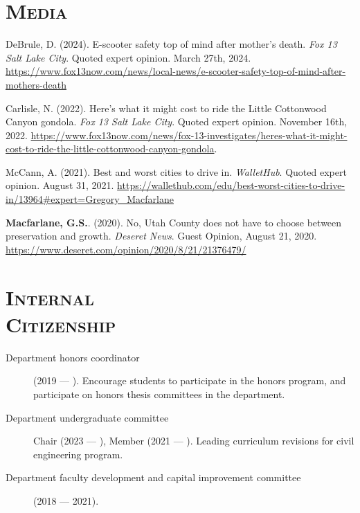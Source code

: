 \documentclass[margin,line]{res}
\newcommand{\secfont}{\scshape }
\begin{document}
\begin{resume}
\noindent\makebox[\linewidth]{\rule{\linewidth}{0.4pt}}

\section{\secfont Media}
DeBrule, D. (2024). E-scooter safety top of mind after mother's death. \textit{Fox 13 Salt Lake City}. Quoted expert opinion. March 27th, 2024. \url{https://www.fox13now.com/news/local-news/e-scooter-safety-top-of-mind-after-mothers-death}

Carlisle, N. (2022). Here’s what it might cost to ride the Little Cottonwood Canyon gondola. \textit{Fox 13 Salt Lake City}. Quoted expert opinion. November 16th, 2022. \url{https://www.fox13now.com/news/fox-13-investigates/heres-what-it-might-cost-to-ride-the-little-cottonwood-canyon-gondola}.

McCann, A. (2021). Best and worst cities to drive in. \textit{WalletHub}. Quoted expert opinion. August 31, 2021. \url{https://wallethub.com/edu/best-worst-cities-to-drive-in/13964#expert=Gregory_Macfarlane}

\textbf{Macfarlane, G.S.}. (2020). No, Utah County does not have to choose between preservation and growth. \textit{Deseret News}. Guest Opinion, August 21, 2020. \url{https://www.deseret.com/opinion/2020/8/21/21376479/}

\noindent\makebox[\linewidth]{\rule{\linewidth}{0.4pt}}
\section{\secfont Internal \\ Citizenship}
\begin{description}
  \item[Department honors coordinator] (2019 --- ). Encourage students to participate
  in the honors program, and participate on honors thesis committees in the
  department.
  \item[Department undergraduate committee] Chair (2023 --- ), Member (2021 --- ). Leading curriculum revisions for civil engineering program.
  \item[Department faculty development and capital improvement committee] (2018 --- 2021).
\end{description}






\end{resume}
\end{document}
